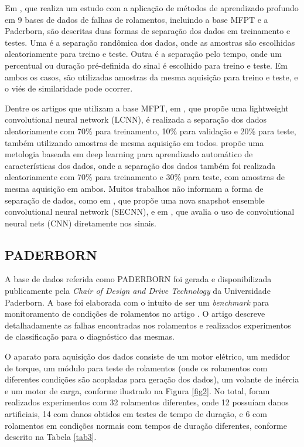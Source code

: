 \documentclass[conference]{IEEEtran}
\begin{document}
Em \cite{b5}, que realiza um estudo com a aplicação de métodos de aprendizado profundo em 9 bases de dados de falhas de rolamentos, incluindo a base MFPT e a Paderborn, são descritas duas formas de separação dos dados em treinamento e testes.
Uma é a separação randômica dos dados, onde as amostras são escolhidas aleatoriamente para treino e teste.
Outra é a separação pelo tempo, onde um percentual ou duração pré-definida do sinal é escolhido para treino e teste.
Em ambos os casos, são utilizadas amostras da mesma aquisição para treino e teste, e o viés de similaridade pode ocorrer.

Dentre os artigos que utilizam a base MFPT, em \cite{b6}, que propõe uma lightweight convolutional neural network (LCNN), é realizada a separação dos dados aleatoriamente com 70\% para treinamento, 10\% para validação e 20\% para teste, também utilizando amostras de mesma aquisição em todos.
\cite{b7} propõe uma metologia baseada em deep learning para aprendizado automático de características dos dados, onde a separação dos dados também foi realizada aleatoriamente com 70\% para treinamento e 30\% para teste, com amostras de mesma aquisição em ambos.
Muitos trabalhos não informam a forma de separação de dados, como em \cite{b8}, que propõe uma nova snapshot ensemble convolutional neural network (SECNN), e em \cite{b9}, que avalia o uso de convolutional neural nets (CNN) diretamente nos sinais.

\subsection{PADERBORN}

A base de dados referida como PADERBORN foi gerada e disponibilizada publicamente pela \textit{Chair of Design and Drive Technology} da Universidade Paderborn.
A base foi elaborada com o intuito de ser um \textit{benchmark} para monitoramento de condições de rolamentos no artigo \cite{b14}.
O artigo descreve detalhadamente as falhas encontradas nos rolamentos e realizados experimentos de classificação para o diagnóstico das mesmas.

O aparato para aquisição dos dados consiste de um motor elétrico, um medidor de torque, um módulo para teste de rolamentos (onde os rolamentos com diferentes condições são acopladas para geração dos dados), um volante de inércia e um motor de carga, conforme ilustrado na Figura \ref{fig2}.
No total, foram realizados experimentos com 32 rolamentos diferentes, onde 12 possuíam danos artificiais, 14 com danos obtidos em testes de tempo de duração, e 6 com rolamentos em condições normais com tempos de duração diferentes, conforme descrito na Tabela \ref{tab3}.
\end{document}
